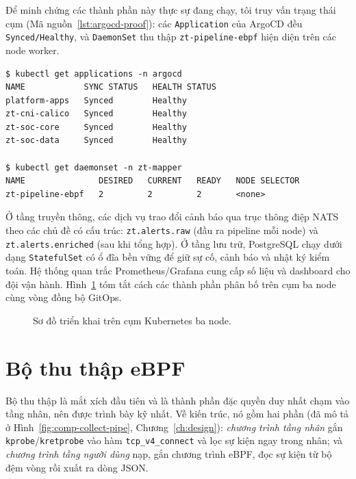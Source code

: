 Để minh chứng các thành phần này thực sự đang chạy, tôi truy vấn trạng thái cụm
(Mã nguồn~\ref{lst:argocd-proof}): các \texttt{Application} của ArgoCD đều
\texttt{Synced/Healthy}, và \texttt{DaemonSet} thu thập \texttt{zt-pipeline-ebpf} hiện
diện trên các node worker.

\begin{lstlisting}[language={},caption={Minh chứng triển khai: ArgoCD đồng bộ và DaemonSet thu thập đang chạy (\texttt{kubectl} rút gọn).},label={lst:argocd-proof}]
$ kubectl get applications -n argocd
NAME            SYNC STATUS   HEALTH STATUS
platform-apps   Synced        Healthy
zt-cni-calico   Synced        Healthy
zt-soc-core     Synced        Healthy
zt-soc-data     Synced        Healthy

$ kubectl get daemonset -n zt-mapper
NAME               DESIRED   CURRENT   READY   NODE SELECTOR
zt-pipeline-ebpf   2         2         2       <none>
\end{lstlisting}

Ở tầng truyền thông, các dịch vụ trao đổi cảnh báo qua trục thông điệp NATS theo các
chủ đề có cấu trúc: \texttt{zt.alerts.raw} (đầu ra pipeline mỗi node) và
\texttt{zt.alerts.enriched} (sau khi tổng hợp). Ở tầng lưu trữ, PostgreSQL chạy dưới
dạng \texttt{StatefulSet} có ổ đĩa bền vững để giữ sự cố, cảnh báo và nhật ký kiểm
toán. Hệ thống quan trắc Prometheus/Grafana cung cấp số liệu và dashboard cho đội vận
hành. Hình~\ref{fig:deploy-topology} tóm tắt cách các thành phần phân bố trên cụm ba
node cùng vòng đồng bộ GitOps.

\begin{figure}[H]
  \centering
  \resizebox{0.95\linewidth}{!}{}
  \caption{Sơ đồ triển khai trên cụm Kubernetes ba node.}
  \label{fig:deploy-topology}
\end{figure}

\section{Bộ thu thập eBPF}
\label{sec:impl-collector}

Bộ thu thập là mắt xích đầu tiên và là thành phần đặc quyền duy nhất chạm vào tầng
nhân, nên được trình bày kỹ nhất. Về kiến trúc, nó gồm hai phần (đã mô tả ở
Hình~\ref{fig:comp-collect-pipe}, Chương~\ref{ch:design}): \emph{chương trình tầng
nhân} gắn \texttt{kprobe}/\texttt{kretprobe} vào hàm \texttt{tcp\_v4\_connect} và lọc
sự kiện ngay trong nhân; và \emph{chương trình tầng người dùng} nạp, gắn chương trình
eBPF, đọc sự kiện từ bộ đệm vòng rồi xuất ra dòng JSON.

